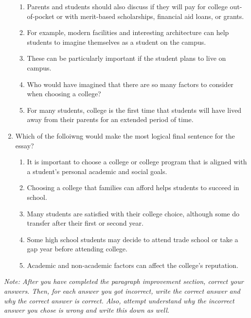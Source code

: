 \begin{enumerate}
\bigskip
\begin{enumerate}[label=(\Alph*)]
\item Parents and students should also discuss if they will pay for college out-of-pocket or with merit-based scholarships, financial aid loans, or grants.
\item For example, modern facilities and interesting architecture can help students to imagine themselves as a student on the campus. 
\item These can be particularly important if the student plans to live on campus. 
\item Who would have imagined that there are so many factors to consider when choosing a college?
\item For many students, college is the first time that students will have lived away from their parents for an extended period of time. 
\end{enumerate}

\bigskip
\item Which of the folloiwng would make the most logical final sentence for the essay?

\bigskip
\begin{enumerate}[label=(\Alph*)]
\item It is important to choose a college or college program that is aligned with a student’s personal academic and social goals. 
\item Choosing a college that families can afford helps students to succeed in school.
\item Many students are satisfied with their college choice, although some do transfer after their first or second year.
\item Some high school students may decide to attend trade school or take a gap year before attending college. 
\item Academic and non-academic factors can affect the college's reputation. 
\end{enumerate}

\end{enumerate}

\textit{Note: After you have completed the paragraph improvement section, correct your answers. Then, for each answer you got incorrect, write the correct answer and why the correct answer is correct. Also, attempt understand why the incorrect answer you chose is wrong and write this down as well.}





